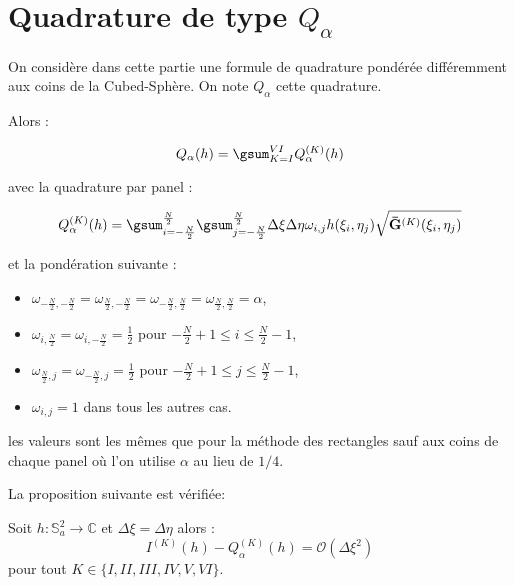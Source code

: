 \section{Quadrature de type $Q_{\alpha}$}

On considère dans cette partie une formule de quadrature pondérée différemment aux coins de la Cubed-Sphère. On note $Q_{\alpha}$ cette quadrature.

Alors :

\begin{equation}
Q_{\alpha}(h)= \gsum_{K=I}^{VI} Q^{(K)}_{\alpha}(h)
\end{equation}

avec la quadrature par panel :

\begin{equation}
Q_{\alpha}^{(K)}(h)=\gsum_{i = -\frac{N}{2}}^{\frac{N}{2}}\gsum_{j = -\frac{N}{2}}^{\frac{N}{2}} \Delta \xi \Delta \eta \omega_{i,j} h(\xi_i, \eta_j) \sqrt{\mathbf{\bar{G}}^{(K)}(\xi_i, \eta_j)}
\label{eq:alpha par panel}
\end{equation}

et la pondération suivante :

\begin{itemize}
\item $\omega_{-\frac{N}{2},-\frac{N}{2}}=\omega_{\frac{N}{2},-\frac{N}{2}}=\omega_{-\frac{N}{2},\frac{N}{2}}=\omega_{\frac{N}{2},\frac{N}{2}}=\alpha$,
\item $\omega_{i,\frac{N}{2}}=\omega_{i,-\frac{N}{2}}=\frac{1}{2}$ pour $-\frac{N}{2}+1 \leq i \leq \frac{N}{2}-1$,
\item $\omega_{\frac{N}{2},j}=\omega_{-\frac{N}{2},j}=\frac{1}{2}$ pour $-\frac{N}{2}+1 \leq j \leq \frac{N}{2}-1$,
\item $\omega_{i,j}=1$ dans tous les autres cas.
\end{itemize}

les valeurs sont les mêmes que pour la méthode des rectangles sauf aux coins de chaque panel où l'on utilise $\alpha$ au lieu de $1/4$.

La proposition suivante est vérifiée:

\begin{proposition}
Soit $h: \mathbb{S}_a^2 \rightarrow \mathbb{C}$ et $\Delta \xi = \Delta \eta$ alors :
\begin{equation}
I^{(K)}(h) - Q^{(K)}_{\alpha}(h) = \mathcal{O} \left( \Delta \xi^2 \right)
\end{equation}
pour tout $K \in \lbrace I, II, III, IV, V, VI \rbrace$.
\label{prop:consistance alpha panel}
\end{proposition}


